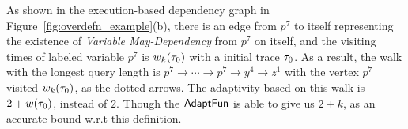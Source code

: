 \begin{example}
    As shown in the execution-based dependency graph in Figure~\ref{fig:overdefn_example}(b), 
    there is an edge from $p^7$ to itself representing the existence of \emph{Variable May-Dependency} from $p^7$ on itself,
    and the visiting times of labeled variable $p^7$ is 
    $w_k(\mathtt{\tau}_0)$ with a initial trace $\mathtt{\tau}_0$. 
    As a result, the walk with the longest query length 
    is
    $p^7  \to \cdots \to p^7 \to y^4  \to z^1 $ with the vertex $p^7$ visited $w_k(\mathtt{\tau}_0)$,
    as the dotted arrows. 
    The adaptivity 
    based on
    this walk
    is $2 + w(\mathtt{\tau}_0)$, instead of $2$. 
    Though the $\textsf{AdaptFun}$ is able to give us $2 + k$,  as an accurate bound w.r.t this definition.
    

\end{example}
